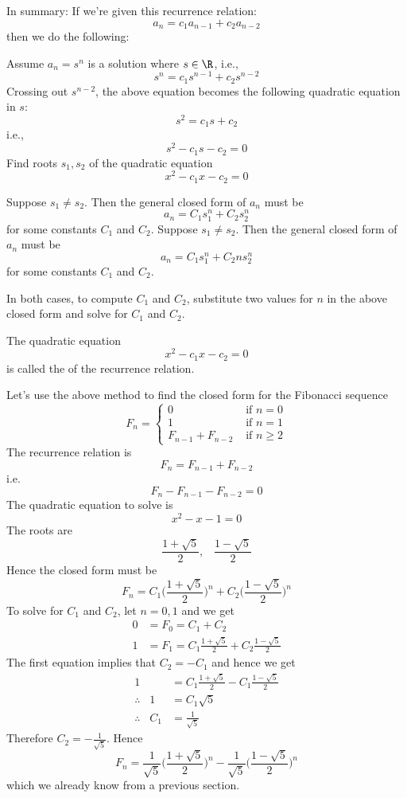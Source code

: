 In summary:
If we're given this recurrence relation:
\[
a_n = c_1 a_{n-1} + c_2 a_{n-2}
\]
then we do the following:

Assume $a_n = s^n$ is a solution where $s \in \R$, i.e.,
\[
s^n = c_1 s^{n-1} + c_2 s^{n-2}
\]
Crossing out $s^{n-2}$, the above equation becomes
the following quadratic equation in $s$:
\[
s^2 = c_1 s + c_2
\]
i.e.,
\[
s^2 - c_1 s - c_2 = 0
\]
Find roots $s_1, s_2$ of the quadratic equation
\[
x^2 - c_1 x - c_2 = 0
\]

\begin{enumerate}[nosep]
\li 
Suppose $s_1 \neq s_2$.
Then the general closed form of $a_n$ must be
\[
a_n = C_1 s_1^n + C_2 s_2^n
\]
for some constants $C_1$ and $C_2$.
\li
Suppose $s_1 \neq s_2$.
Then the general closed form of $a_n$ must be
\[
a_n = C_1 s_1^n + C_2 ns_2^n
\]
for some constants $C_1$ and $C_2$.
\end{enumerate}
In both cases, to compute $C_1$ and $C_2$, substitute two values
for $n$ in the above closed form and solve for $C_1$ and $C_2$. 

The quadratic equation
\[
x^2 - c_1 x - c_2 = 0
\]
is called the
 of the recurrence relation.


Let's use the above method to find the closed form for 
the Fibonacci sequence
\[
F_n = \begin{cases}
0 &\text{ if } n = 0 \\
1 &\text{ if } n = 1 \\
F_{n-1} + F_{n-2} &\text{ if } n \geq 2
\end{cases}
\]
The recurrence relation is
\[
F_n = F_{n - 1} + F_{n-2}
\]
i.e.
\[
F_n - F_{n - 1} - F_{n-2} = 0
\]
The quadratic equation to solve is
\[
x^2 - x - 1 = 0
\]
The roots are
\[
\frac{1 + \sqrt{5}}{2}, \,\,\,\,\,
\frac{1 - \sqrt{5}}{2}
\]
Hence the closed form must be 
\[
F_n = C_1 \biggl( \frac{1 + \sqrt{5}}{2} \biggr)^n
+ C_2 \biggl( \frac{1 - \sqrt{5}}{2} \biggr)^n
\]
To solve for $C_1$ and $C_2$, let $n = 0, 1$ and we get
\begin{align*}
0 &= F_0 = C_1 + C_2 \\
1 &= F_1 = C_1 \frac{1 + \sqrt{5}}{2} + C_2 \frac{1 - \sqrt{5}}{2}
\end{align*}
The first equation implies that $C_2 = - C_1$ and hence we get
\begin{align*}
1 &= C_1 \frac{1 + \sqrt{5}}{2} - C_1 \frac{1 - \sqrt{5}}{2} \\
\therefore \,\,\,\,\, 
1 &= C_1 \sqrt{5} \\
\therefore\,\,\,\,\,
C_1 &= \frac{1}{\sqrt{5}}
\end{align*}
Therefore $C_2 = -\frac{1}{\sqrt{5}}$. 
Hence
\[
F_n = 
\frac{1}{\sqrt{5}} \biggl( \frac{1 + \sqrt{5}}{2} \biggr)^n
-
\frac{1}{\sqrt{5}}
\biggl( \frac{1 - \sqrt{5}}{2} \biggr)^n
\]
which we already know from a previous section.

